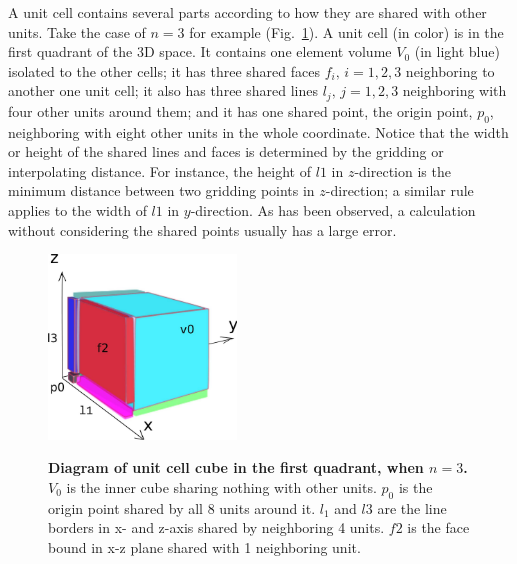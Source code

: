 A unit cell contains several parts according to how they are shared with other units. Take the case of $n=3$ for example (Fig.~\ref{cube}). A unit cell (in color) is in the first quadrant of the 3D space. It contains one element volume $V_0$ (in light blue) isolated to the other cells; it has three shared faces $f_i, \, i=1,2,3$ neighboring to another one unit cell; it also has three shared lines $l_j,\, j=1,2,3$ neighboring with four other units around them; and it has one shared point, the origin point, $p_0$, neighboring with eight other units in the whole coordinate. Notice that the width or height of the shared lines and faces is determined by the gridding or interpolating distance. For instance, the height of $l1$ in $z$-direction is the minimum distance between two gridding points in $z$-direction; a similar rule applies to the width of $l1$ in $y$-direction. As has been observed, a calculation without considering the shared points usually has a large error.
\begin{figure}[htp]
\centering
\begin{center}
{\includegraphics[width=5cm]{./Figs/cube1}}
\end{center}
\caption[Diagram of unit cell cube in the first quadrant.]{\textbf{Diagram of unit cell cube in the first quadrant, when $n=3$.} $V_0$ is the inner cube sharing nothing with other units. $p_0$ is the origin point shared by all 8 units around it. $l_1$ and $l3$ are the line borders in x- and z-axis shared by neighboring 4 units. $f2$ is the face bound in x-z plane shared with 1 neighboring unit.}
\label{cube}
\end{figure}

